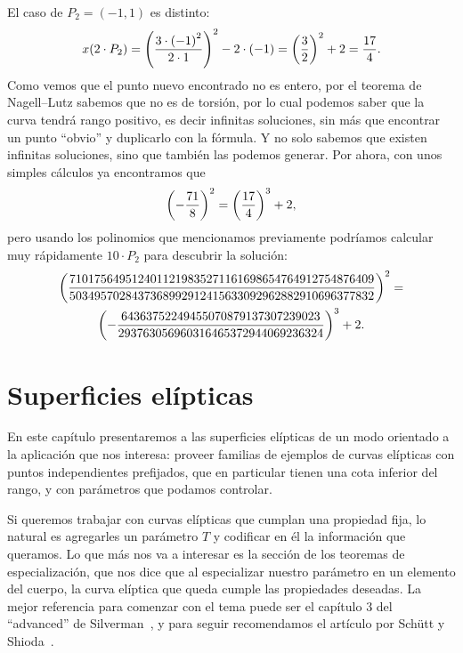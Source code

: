 \documentclass[a4paper]{book}
\theoremstyle{definition}
\theoremstyle{plain}
\newcommand{\lp}{\left\lparen}
\newcommand{\rp}{\right\rparen}
\begin{document}
El caso de $P_2 = (-1,1)$ es distinto:
\[
x(2\cdot P_2) = {\lp \frac{3\cdot {(-1)}^2}{2\cdot 1} \rp}^2 - 2\cdot (-1) = {\lp \frac{3}{2} \rp}^2 + 2 = \frac{17}{4}.
\]
Como vemos que el punto nuevo encontrado no es entero, por el teorema de Nagell--Lutz sabemos que no es de torsión, por lo cual podemos saber que la curva tendrá rango positivo, es decir infinitas soluciones, sin más que encontrar un punto ``obvio'' y duplicarlo con la fórmula. Y no solo sabemos que existen infinitas soluciones, sino que también las podemos generar. Por ahora, con unos simples cálculos ya encontramos que
\[
{\lp -\frac{71}{8} \rp}^2 = {\lp \frac{17}{4} \rp}^3 + 2,
\]
pero usando los polinomios que mencionamos previamente podríamos calcular muy rápidamente $10\cdot P_2$ para descubrir la solución:
\begin{multline*}
{\lp\frac{7101756495124011219835271161698654764912754876409}
{5034957028437368992912415633092962882910696377832}\rp}^2 = \\
{\lp-\frac{64363752249455070879137307239023}
{293763056960316465372944069236324}\rp}^3 +2.
\end{multline*}




\chapter{Superficies elípticas}\label{cap:superficiesElipticas}

En este capítulo presentaremos a las superficies elípticas de un modo orientado a la aplicación que nos interesa: proveer familias de ejemplos de curvas elípticas con puntos independientes prefijados, que en particular tienen una cota inferior del rango, y con parámetros que podamos controlar. 

Si queremos trabajar con curvas elípticas que cumplan una propiedad fija, lo natural es agregarles un parámetro $T$ y codificar en él la información que queramos. Lo que más nos va a interesar es la sección de los teoremas de especialización, que nos dice que al especializar nuestro parámetro en un elemento del cuerpo, la curva elíptica que queda cumple las propiedades deseadas. La mejor referencia para comenzar con el tema puede ser el capítulo 3 del ``advanced'' de Silverman~\cite{SilvermanAdvanced}, y para seguir recomendamos el artículo por Schütt y Shioda~\cite{SchuttShioda2010}.
\end{document}
